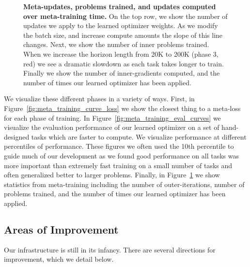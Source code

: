 \documentclass[11pt]{article}
\begin{document}
\begin{figure}[t!]
    \centering
    \caption{\textbf{Meta-updates, problems trained, and updates computed over meta-training time.} On the top row, we show the number of updates we apply to the learned optimizer weights. As we modify the batch size, and increase compute amounts the slope of this line changes. Next, we show the number of inner problems trained. When we increase the horizon length from 20K to 200K (phase 3, red) we see a dramatic slowdown as each task takes longer to train. Finally we show the number of inner-gradients computed, and the number of times our learned optimizer has been applied.
    \label{fig:meta_training_stats}
    }
\end{figure}


We visualize these different phases in a variety of ways.
First, in Figure~\ref{fig:meta_training_curve_loss} we show the closest thing to a meta-loss for each phase of training. In Figure~\ref{fig:meta_training_eval_curves} we visualize the evaluation performance of our learned optimizer on a set of hand-designed tasks which are faster to compute. We visualize performance at different percentiles of performance. These figures we often used the 10th percentile to guide much of our development as we found good performance on all tasks was more important than extremely fast training on a small number of tasks and often generalized better to larger problems.
Finally, in Figure~\ref{fig:meta_training_stats} we show statistics from meta-training including the number of outer-iterations, number of problems trained, and the number of times our learned optimizer has been applied.

\subsection{Areas of Improvement}
Our infrastructure is still in its infancy. There are several directions for improvement, which we detail below.
\end{document}
